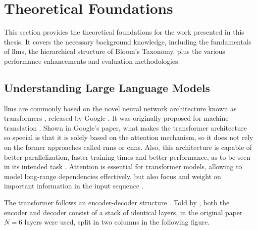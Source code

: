 \section{Theoretical Foundations} \label{sec:theoretical-foundations}

This section provides the theoretical foundations for the work presented in this thesis. It covers the necessary background knowledge, including the fundamentals of \ac{llms}, the hierarchical structure of Bloom's Taxonomy, plus the various performance enhancements and evaluation methodologies.

\subsection{Understanding Large Language Models}


\hspace{1.5em} \ac{llms} are commonly based on the novel neural network architecture known as transformers \cite{naik_large_2024}, released by Google \cite{vaswani_attention_2017}. It was originally proposed for machine translation \cite{minaee_large_2025,vaswani_attention_2017}. Shown in Google's paper, what makes the transformer architecture so special is that it is solely based on the attention mechanism, so it does not rely on the former approaches called \ac{rnns} or \ac{cnns}. Also, this architecture is capable of better parallelization, faster training times and better performance, as to be seen in its intended task \cite{vaswani_attention_2017}. Attention is essential for transformer models, allowing to model long-range dependencies effectively, but also focus and weight on important information in the input sequence \cite{patil_review_2024}. 

The transformer follows an encoder-decoder structure \cite{patil_review_2024,minaee_large_2025}. Told by \cite{minaee_large_2025,vaswani_attention_2017}, both the encoder and decoder consist of a stack of identical layers, in the original paper $N=6$ layers were used, split in two columns in the following figure.

